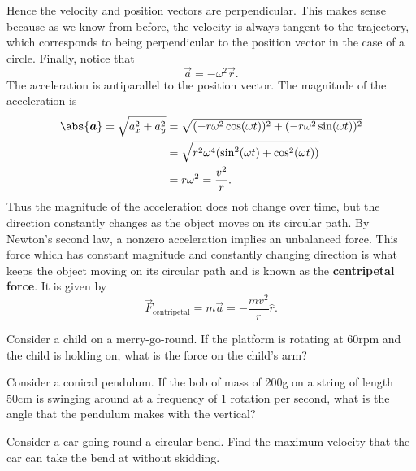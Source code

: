 \documentclass[../newtonian_mechanics.tex]{subfiles}
\begin{document}
        Hence the velocity and position vectors are perpendicular.
        This makes sense because as we know from before, the velocity is always tangent to the trajectory, which corresponds to being perpendicular to the position vector in the case of a circle.
        Finally, notice that
        \begin{equation}
            \vec{a}=-\omega^2\vec{r}.
        \end{equation}
        The acceleration is antiparallel to the position vector.
        The magnitude of the acceleration is
        \begin{align}
            \abs{\vec{a}}=\sqrt{a_x^2+a_y^2}&=\sqrt{(-r\omega^2\cos(\omega t))^2+(-r\omega^2\sin(\omega t))^2}\\
            &=\sqrt{r^2\omega^4(\sin^2(\omega t)+\cos^2(\omega t))}\\
            &=r\omega^2=\frac{v^2}{r}.
        \end{align}
        Thus the magnitude of the acceleration does not change over time, but the direction constantly changes as the object moves on its circular path.
        By Newton's second law, a nonzero acceleration implies an unbalanced force.
        This force which has constant magnitude and constantly changing direction is what keeps the object moving on its circular path and is known as the \textbf{centripetal force}.
        It is given by
        \begin{equation}
            \vec{F}_\text{centripetal}=m\vec{a}=-\frac{mv^2}{r}\hat{r}.
        \end{equation}
        \begin{example}
            Consider a child on a merry-go-round.
            If the platform is rotating at 60rpm and the child is holding on, what is the force on the child's arm?
        \end{example}
        \begin{example}
            Consider a conical pendulum. 
            If the bob of mass of 200g on a string of length 50cm is swinging around at a frequency of 1 rotation per second, what is the angle that the pendulum makes with the vertical?
        \end{example}
        \begin{example}
            Consider a car going round a circular bend.
            Find the maximum velocity that the car can take the bend at without skidding.
        \end{example}
\end{document}
